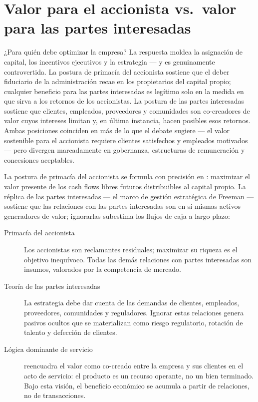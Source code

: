 \section{Valor para el accionista vs.\ valor para las partes interesadas}\label{sec:stakeholder-value}

¿Para quién debe optimizar la empresa? La respuesta moldea la asignación de capital, los
incentivos ejecutivos y la estrategia --- y es genuinamente controvertida. La postura de primacía
del accionista sostiene que el deber fiduciario de la administración recae en los propietarios del
capital propio; cualquier beneficio para las partes interesadas es legítimo solo en la medida en
que sirva a los retornos de los accionistas. La postura de las partes interesadas sostiene que
clientes, empleados, proveedores y comunidades son co-creadores de valor cuyos intereses limitan
y, en última instancia, hacen posibles esos retornos. Ambas posiciones coinciden en más de lo que
el debate sugiere --- el valor sostenible para el accionista requiere clientes satisfechos y
empleados motivados --- pero divergen marcadamente en gobernanza, estructuras de remuneración y
concesiones aceptables.

La postura de primacía del accionista se formula con precisión en \textcite{ross2022}: maximizar
el valor presente de los cash flows libres futuros distribuibles al capital propio. La
réplica de las partes interesadas --- el marco de gestión estratégica de Freeman --- sostiene que
las relaciones con las partes interesadas son en sí mismas activos generadores de valor; ignorarlas
subestima los flujos de caja a largo plazo:
\begin{description}
  \item[Primacía del accionista] Los accionistas son reclamantes residuales; maximizar su riqueza
    es el objetivo inequívoco. Todas las demás relaciones con partes interesadas son insumos,
    valorados por la competencia de mercado. \parencite{brealey2020}
  \item[Teoría de las partes interesadas] La estrategia debe dar cuenta de las demandas de
    clientes, empleados, proveedores, comunidades y reguladores. Ignorar estas relaciones genera
    pasivos ocultos que se materializan como riesgo regulatorio, rotación de talento y defección
    de clientes.
  \item[Lógica dominante de servicio] \textcite{vargo2004service} reencuadra el valor como
    co-creado entre la empresa y sus clientes en el acto de servicio: el producto es un recurso
    operante, no un bien terminado. Bajo esta visión, el beneficio económico se acumula a partir
    de relaciones, no de transacciones.
\end{description}

